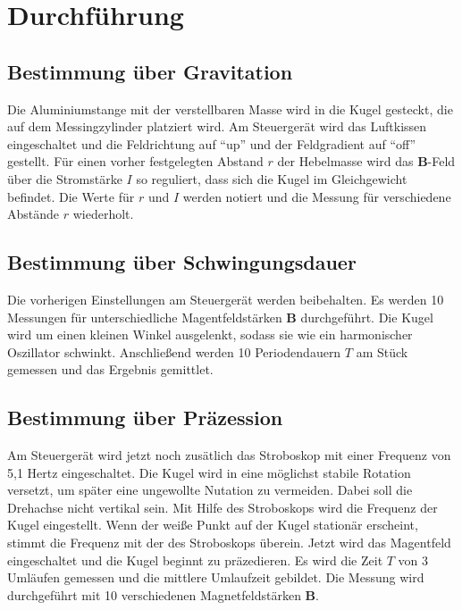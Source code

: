\section{Durchführung}
\label{sec:Durchführung}
\subsection{Bestimmung über Gravitation}
Die Aluminiumstange mit der verstellbaren Masse wird in die Kugel gesteckt,
die auf dem Messingzylinder platziert wird.
Am Steuergerät wird das Luftkissen eingeschaltet und die Feldrichtung auf \enquote{up} und
der Feldgradient auf \enquote{off} gestellt.
Für einen vorher festgelegten Abstand $r$ der Hebelmasse wird das $\symbf{B}$-Feld über
die Stromstärke $I$ so reguliert, dass sich die Kugel im Gleichgewicht befindet.
Die Werte für $r$ und $I$ werden notiert und die Messung für verschiedene Abstände $r$ wiederholt.

\subsection{Bestimmung über Schwingungsdauer}

Die vorherigen Einstellungen am Steuergerät werden beibehalten.
Es werden 10 Messungen für unterschiedliche Magentfeldstärken $\symbf{B}$ durchgeführt.
Die Kugel wird um einen kleinen Winkel ausgelenkt, sodass sie wie ein harmonischer Oszillator schwinkt.
Anschließend werden 10 Periodendauern $T$ am Stück gemessen und das Ergebnis gemittlet.

\subsection{Bestimmung über Präzession}

Am Steuergerät wird jetzt noch zusätlich das Stroboskop mit einer Frequenz von 5,1 Hertz eingeschaltet.
Die Kugel wird in eine möglichst stabile Rotation versetzt, um später eine ungewollte Nutation zu vermeiden.
Dabei soll die Drehachse nicht vertikal sein.
Mit Hilfe des Stroboskops wird die Frequenz der Kugel eingestellt.
Wenn der weiße Punkt auf der Kugel stationär erscheint, stimmt die Frequenz mit der des Stroboskops überein.
Jetzt wird das Magentfeld eingeschaltet und die Kugel beginnt zu präzedieren.
Es wird die Zeit $T$ von 3 Umläufen gemessen und die mittlere Umlaufzeit gebildet.
Die Messung wird durchgeführt mit 10 verschiedenen Magnetfeldstärken $\symbf{B}$.
